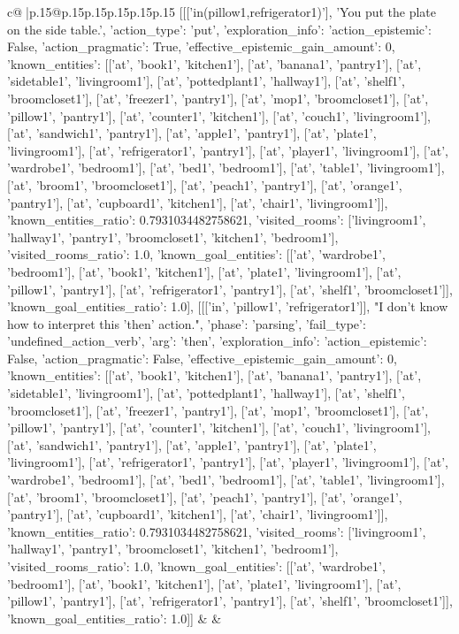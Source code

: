 \documentclass{article}
\begin{document}
{\begin{supertabular}{c@{$\;$}|p{.15\linewidth}@{}p{.15\linewidth}p{.15\linewidth}p{.15\linewidth}p{.15\linewidth}p{.15\linewidth}}
{{{	 [[['in(pillow1,refrigerator1)'], 'You put the plate on the side table.', {'action_type': 'put', 'exploration_info': {'action_epistemic': False, 'action_pragmatic': True, 'effective_epistemic_gain_amount': 0, 'known_entities': [['at', 'book1', 'kitchen1'], ['at', 'banana1', 'pantry1'], ['at', 'sidetable1', 'livingroom1'], ['at', 'pottedplant1', 'hallway1'], ['at', 'shelf1', 'broomcloset1'], ['at', 'freezer1', 'pantry1'], ['at', 'mop1', 'broomcloset1'], ['at', 'pillow1', 'pantry1'], ['at', 'counter1', 'kitchen1'], ['at', 'couch1', 'livingroom1'], ['at', 'sandwich1', 'pantry1'], ['at', 'apple1', 'pantry1'], ['at', 'plate1', 'livingroom1'], ['at', 'refrigerator1', 'pantry1'], ['at', 'player1', 'livingroom1'], ['at', 'wardrobe1', 'bedroom1'], ['at', 'bed1', 'bedroom1'], ['at', 'table1', 'livingroom1'], ['at', 'broom1', 'broomcloset1'], ['at', 'peach1', 'pantry1'], ['at', 'orange1', 'pantry1'], ['at', 'cupboard1', 'kitchen1'], ['at', 'chair1', 'livingroom1']], 'known_entities_ratio': 0.7931034482758621, 'visited_rooms': ['livingroom1', 'hallway1', 'pantry1', 'broomcloset1', 'kitchen1', 'bedroom1'], 'visited_rooms_ratio': 1.0, 'known_goal_entities': [['at', 'wardrobe1', 'bedroom1'], ['at', 'book1', 'kitchen1'], ['at', 'plate1', 'livingroom1'], ['at', 'pillow1', 'pantry1'], ['at', 'refrigerator1', 'pantry1'], ['at', 'shelf1', 'broomcloset1']], 'known_goal_entities_ratio': 1.0}}], [[['in', 'pillow1', 'refrigerator1']], "I don't know how to interpret this 'then' action.", {'phase': 'parsing', 'fail_type': 'undefined_action_verb', 'arg': 'then', 'exploration_info': {'action_epistemic': False, 'action_pragmatic': False, 'effective_epistemic_gain_amount': 0, 'known_entities': [['at', 'book1', 'kitchen1'], ['at', 'banana1', 'pantry1'], ['at', 'sidetable1', 'livingroom1'], ['at', 'pottedplant1', 'hallway1'], ['at', 'shelf1', 'broomcloset1'], ['at', 'freezer1', 'pantry1'], ['at', 'mop1', 'broomcloset1'], ['at', 'pillow1', 'pantry1'], ['at', 'counter1', 'kitchen1'], ['at', 'couch1', 'livingroom1'], ['at', 'sandwich1', 'pantry1'], ['at', 'apple1', 'pantry1'], ['at', 'plate1', 'livingroom1'], ['at', 'refrigerator1', 'pantry1'], ['at', 'player1', 'livingroom1'], ['at', 'wardrobe1', 'bedroom1'], ['at', 'bed1', 'bedroom1'], ['at', 'table1', 'livingroom1'], ['at', 'broom1', 'broomcloset1'], ['at', 'peach1', 'pantry1'], ['at', 'orange1', 'pantry1'], ['at', 'cupboard1', 'kitchen1'], ['at', 'chair1', 'livingroom1']], 'known_entities_ratio': 0.7931034482758621, 'visited_rooms': ['livingroom1', 'hallway1', 'pantry1', 'broomcloset1', 'kitchen1', 'bedroom1'], 'visited_rooms_ratio': 1.0, 'known_goal_entities': [['at', 'wardrobe1', 'bedroom1'], ['at', 'book1', 'kitchen1'], ['at', 'plate1', 'livingroom1'], ['at', 'pillow1', 'pantry1'], ['at', 'refrigerator1', 'pantry1'], ['at', 'shelf1', 'broomcloset1']], 'known_goal_entities_ratio': 1.0}}]] 
	  } 
	   } 
	   } 
	 & & \\ 
 


\end{supertabular}}
\end{document}
